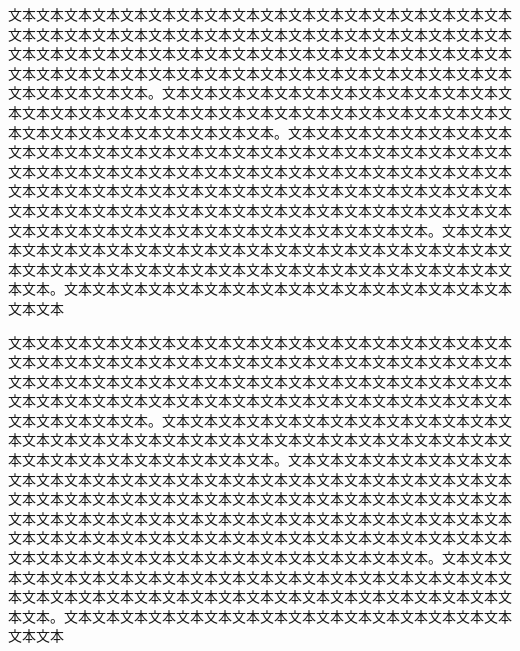 文本文本文本文本文本文本文本文本文本文本文本文本文本文本文本文本文本文本文本文本文本文本文本文本文本文本文本文本文本文本文本文本文本文本文本文本文本文本文本文本文本文本文本文本文本文本文本文本文本文本文本文本文本文本文本文本文本文本文本文本文本文本文本文本文本文本文本文本文本文本文本文本文本文本文本文本文本。文本文本文本文本文本文本文本文本文本文本文本文本文本文本文本文本文本文本文本文本文本文本文本文本文本文本文本文本文本文本文本文本文本文本文本文本文本文本文本文本。文本文本文本文本文本文本文本文本文本文本文本文本文本文本文本文本文本文本文本文本文本文本文本文本文本文本文本文本文本文本文本文本文本文本文本文本文本文本文本文本文本文本文本文本文本文本文本文本文本文本文本文本文本文本文本文本文本文本文本文本文本文本文本文本文本文本文本文本文本文本文本文本文本文本文本文本文本文本文本文本文本文本文本文本文本文本文本文本文本文本文本文本文本文本文本。文本文本文本文本文本文本文本文本文本文本文本文本文本文本文本文本文本文本文本文本文本文本文本文本文本文本文本文本文本文本文本文本文本文本文本文本文本文本文本文本。文本文本文本文本文本文本文本文本文本文本文本文本文本文本文本文本文本文本

文本文本文本文本文本文本文本文本文本文本文本文本文本文本文本文本文本文本文本文本文本文本文本文本文本文本文本文本文本文本文本文本文本文本文本文本文本文本文本文本文本文本文本文本文本文本文本文本文本文本文本文本文本文本文本文本文本文本文本文本文本文本文本文本文本文本文本文本文本文本文本文本文本文本文本文本文本。文本文本文本文本文本文本文本文本文本文本文本文本文本文本文本文本文本文本文本文本文本文本文本文本文本文本文本文本文本文本文本文本文本文本文本文本文本文本文本文本。文本文本文本文本文本文本文本文本文本文本文本文本文本文本文本文本文本文本文本文本文本文本文本文本文本文本文本文本文本文本文本文本文本文本文本文本文本文本文本文本文本文本文本文本文本文本文本文本文本文本文本文本文本文本文本文本文本文本文本文本文本文本文本文本文本文本文本文本文本文本文本文本文本文本文本文本文本文本文本文本文本文本文本文本文本文本文本文本文本文本文本文本文本文本文本。文本文本文本文本文本文本文本文本文本文本文本文本文本文本文本文本文本文本文本文本文本文本文本文本文本文本文本文本文本文本文本文本文本文本文本文本文本文本文本文本。文本文本文本文本文本文本文本文本文本文本文本文本文本文本文本文本文本文本


\vspace*{1.0\baselineskip}
\noindent
{\fontsize{12pt}{12pt}\selectfont {} }%

\clearpage						%
